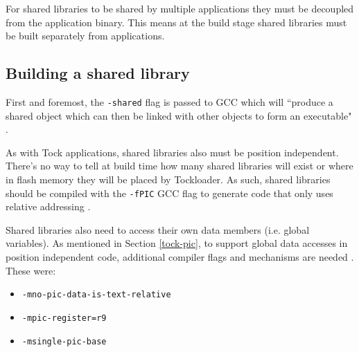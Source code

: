\documentclass[12pt]{ucsddissertation}
\begin{document}
%
%
%
%

For shared libraries to be shared by multiple applications they must be decoupled from the application binary. This means at the build stage shared libraries must be built separately from applications. 

\subsection{Building a shared library} \label{impl-build}

First and foremost, the \texttt{-shared} flag is passed to GCC which will ``produce a shared object which can then be linked with other objects to form an executable" \cite{gcc-link}. 

As with Tock applications, shared libraries also must be position independent. There's no way to tell at build time how many shared libraries will exist or where in flash memory they will be placed by Tockloader. As such, shared libraries should be compiled with the \texttt{-fPIC} GCC flag to generate code that only uses relative addressing \cite{gcc-codegen}. 

Shared libraries also need to access their own data members (i.e. global variables). As mentioned in Section \ref{tock-pic}, to support global data accesses in position independent code, additional compiler flags and mechanisms are needed \cite{tock-compilation}. These were:
\begin{itemize}
    \item \texttt{-mno-pic-data-is-text-relative}
    \item \texttt{-mpic-register=r9}
    \item \texttt{-msingle-pic-base}
\end{itemize}
\end{document}

